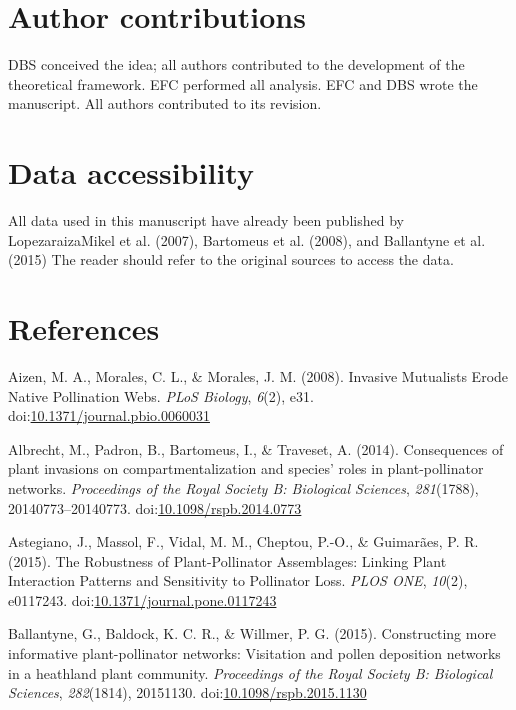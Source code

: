 \documentclass[a4paper]{artikel1}
\theoremstyle{definition}
\theoremstyle{definition}
\theoremstyle{definition}
\theoremstyle{remark}
\begin{document}
\section{Author contributions}\label{author-contributions}

DBS conceived the idea; all authors contributed to the development of
the theoretical framework. EFC performed all analysis. EFC and DBS wrote
the manuscript. All authors contributed to its revision.

\section{Data accessibility}\label{data-accessibility}

All data used in this manuscript have already been published by
Lopezaraiza\textendash{}Mikel et al. (2007), Bartomeus et al. (2008),
and Ballantyne et al. (2015) The reader should refer to the original
sources to access the data.

\section*{References}\label{references}

\hypertarget{refs}{}
\hypertarget{ref-aizen_invasive_2008}{}
Aizen, M. A., Morales, C. L., \& Morales, J. M. (2008). Invasive
Mutualists Erode Native Pollination Webs. \emph{PLoS Biology},
\emph{6}(2), e31.
doi:\href{https://doi.org/10.1371/journal.pbio.0060031}{10.1371/journal.pbio.0060031}

\hypertarget{ref-albrecht_consequences_2014}{}
Albrecht, M., Padron, B., Bartomeus, I., \& Traveset, A. (2014).
Consequences of plant invasions on compartmentalization and species'
roles in plant-pollinator networks. \emph{Proceedings of the Royal
Society B: Biological Sciences}, \emph{281}(1788), 20140773--20140773.
doi:\href{https://doi.org/10.1098/rspb.2014.0773}{10.1098/rspb.2014.0773}

\hypertarget{ref-astegiano_robustness_2015}{}
Astegiano, J., Massol, F., Vidal, M. M., Cheptou, P.-O., \& Guimarães,
P. R. (2015). The Robustness of Plant-Pollinator Assemblages: Linking
Plant Interaction Patterns and Sensitivity to Pollinator Loss.
\emph{PLOS ONE}, \emph{10}(2), e0117243.
doi:\href{https://doi.org/10.1371/journal.pone.0117243}{10.1371/journal.pone.0117243}

\hypertarget{ref-ballantyne_constructing_2015}{}
Ballantyne, G., Baldock, K. C. R., \& Willmer, P. G. (2015).
Constructing more informative plant-pollinator networks: Visitation and
pollen deposition networks in a heathland plant community.
\emph{Proceedings of the Royal Society B: Biological Sciences},
\emph{282}(1814), 20151130.
doi:\href{https://doi.org/10.1098/rspb.2015.1130}{10.1098/rspb.2015.1130}
\end{document}
